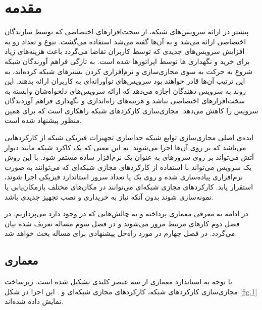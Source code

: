 \chapter{مقدمه}

پیشتر در ارائه سرویس‌های شبکه، از سخت‌افزارهای اختصاصی که توسط سازندگان اختصاصی ارائه می‌شد و به آن‌ها
گفته می‌شد استفاده می‌گشت.
تنوع و تعداد رو به افزایش سرویس‌های جدیدی که توسط کاربران تقاضا می‌گردد
باعث هزینه‌های زیاد برای خرید و نگهداری
‌ها
توسط اپراتورها شده است.
به تازگی فراهم آورندگان شبکه
شروع به حرکت به سوی مجازی‌سازی و نرم‌افزاری کردن بسترهای شبکه کرده‌اند،
به این ترتیب آن‌ها قادر خواهند بود
سرویس‌های نوآورانه‌ای به کاربران ارائه بدهند.
این روند به سرویس دهندگان اجازه می‌دهد که ارائه سرویس‌های دلخواه‌شان وابسته به سخت‌افزارهای اختصاصی نباشد و 
هزینه‌های راه‌اندازی و نگهداری فراهم آوردندگان سرویس را کاهش می‌دهد.
مجازی‌سازی کارکردهای شبکه‌ راهکاری است که برای همین منظور پیشنهاد شده است.

ایده‌ی اصلی مجازی‌سازی توابع شبکه جداسازی تجهیزات فیزیکی شبکه از کارکردهایی می‌باشد که
بر روی آن‌ها اجرا می‌شوند.
به این معنی که یک کاکرد شبکه مانند دیوار آتش می‌تواند بر روی سرورهای
به عنوان یک نرم‌افزار ساده مستقر شود.
با این روش یک سرویس می‌تواند با استفاده از کارکردهای مجازی شبکه‌ای که می‌توانند به صورت نرم‌افزاری پیاده‌سازی شده
و روی یک یا تعداد سرور استاندارد فیزیکی اجرا شوند، استقرار یابد.
کارکردهای مجازی شبکه‌ای می‌توانند در مکان‌های مختلف بازمکان‌یابی یا نمونه‌سازی شوند بدون آنکه
نیاز به خریداری و نصب تجهیز جدیدی باشد.
\cite{Mijumbi2016}

در ادامه به معرفی معماری  پرداخته
و به چالش‌هایی که در  وجود دارد می‌پردازیم.
در فصل دوم کارهای مرتبط مرور می‌شوند و در فصل سوم مساله تعریف شده بیان می‌گردد. در فصل چهارم
در مورد راه‌حل پیشنهادی برای مساله بحث خواهد شد.

\section{معماری }
با توجه به استاندارد  معماری 
از سه عنصر کلیدی تشکیل شده است.
زیرساخت مجازی‌سازی کارکردهای شبکه،
کارکردهای مجازی شبکه‌ای و
.
این اجزا در شکل \cref{fig.1} نمایش داده شده‌اند.

